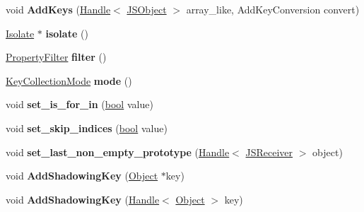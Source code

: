 \begin{DoxyCompactItemize}
\item 
\mbox{\label{classv8_1_1internal_1_1KeyAccumulator_a7aaa1a3f7b1ed05c0446b59cd75b03fb}} 
void {\bfseries Add\+Keys} (\mbox{\hyperlink{classv8_1_1internal_1_1Handle}{Handle}}$<$ \mbox{\hyperlink{classv8_1_1internal_1_1JSObject}{J\+S\+Object}} $>$ array\+\_\+like, Add\+Key\+Conversion convert)
\item 
\mbox{\label{classv8_1_1internal_1_1KeyAccumulator_ad558243b1dbdb5d9a8b417180714c66c}} 
\mbox{\hyperlink{classv8_1_1internal_1_1Isolate}{Isolate}} $\ast$ {\bfseries isolate} ()
\item 
\mbox{\label{classv8_1_1internal_1_1KeyAccumulator_a95a3059bd4c0370f6e9a8d1606041e66}} 
\mbox{\hyperlink{namespacev8_afbf02b6b1152a3e25d7bde90798209ac}{Property\+Filter}} {\bfseries filter} ()
\item 
\mbox{\label{classv8_1_1internal_1_1KeyAccumulator_a4788fd0baf4548a50fdc9b3a7f3ea0c1}} 
\mbox{\hyperlink{namespacev8_a0cee20f5c7f0d59d0835af8e537388dc}{Key\+Collection\+Mode}} {\bfseries mode} ()
\item 
\mbox{\label{classv8_1_1internal_1_1KeyAccumulator_a6b73fa1b431144ff8c188abd4a277f46}} 
void {\bfseries set\+\_\+is\+\_\+for\+\_\+in} (\mbox{\hyperlink{classbool}{bool}} value)
\item 
\mbox{\label{classv8_1_1internal_1_1KeyAccumulator_a9fd532e8dac77f8b3fe42e4f85c94c35}} 
void {\bfseries set\+\_\+skip\+\_\+indices} (\mbox{\hyperlink{classbool}{bool}} value)
\item 
\mbox{\label{classv8_1_1internal_1_1KeyAccumulator_aaef19a38bc319d88e30eea0c7a252c70}} 
void {\bfseries set\+\_\+last\+\_\+non\+\_\+empty\+\_\+prototype} (\mbox{\hyperlink{classv8_1_1internal_1_1Handle}{Handle}}$<$ \mbox{\hyperlink{classv8_1_1internal_1_1JSReceiver}{J\+S\+Receiver}} $>$ object)
\item 
\mbox{\label{classv8_1_1internal_1_1KeyAccumulator_ac30674b4d259b4690954d8bfe41e2805}} 
void {\bfseries Add\+Shadowing\+Key} (\mbox{\hyperlink{classv8_1_1internal_1_1Object}{Object}} $\ast$key)
\item 
\mbox{\label{classv8_1_1internal_1_1KeyAccumulator_aa5d85c7502facb3b96bc52bc938c48b9}} 
void {\bfseries Add\+Shadowing\+Key} (\mbox{\hyperlink{classv8_1_1internal_1_1Handle}{Handle}}$<$ \mbox{\hyperlink{classv8_1_1internal_1_1Object}{Object}} $>$ key)
\end{DoxyCompactItemize}
